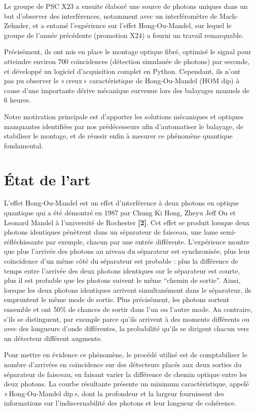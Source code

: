 \documentclass[a4paper, 12pt]{article}
\begin{document}
Le groupe de PSC X23 a ensuite élaboré une source de photons uniques dans un but d’observer des interférences, notamment avec un interféromètre de Mach-Zehnder, et a entamé l’expérience sur l’effet Hong-Ou-Mandel, sur lequel le groupe de l’année précédente (promotion X24) a fourni un travail remarquable.

Précisément, ils ont mis en place le montage optique fibré, optimisé le signal pour atteindre environ 700 coïncidences (détection simulanée de photons) par seconde, et développé un logiciel d'acquisition complet en Python. Cependant, ils n'ont pas pu observer le « creux » caractéristique de Hong-Ou-Mandel (HOM dip) à cause d'une importante dérive mécanique survenue lors des balayages manuels de 6 heures.

Notre motivation principale est d'apporter les solutions mécaniques et optiques manquantes identifiées par nos prédécesseurs afin d'automatiser le balayage, de stabiliser le montage, et de réussir enfin à mesurer ce phénomène quantique fondamental.

\clearpage
\section{État de l’art}

L'effet Hong-Ou-Mandel est un effet d'interférence à deux photons en optique quantique qui a été démontré en 1987 par Chung Ki Hong, Zheyu Jeff Ou et Leonard Mandel à l'université de Rochester \textbf{[2]}. Cet effet se produit lorsque deux photons identiques pénètrent dans un séparateur de faisceau, une lame semi-réfléchissante par exemple, chacun par une entrée différente. L’expérience montre que plus l’arrivée des photons au niveau du séparateur est synchronisée, plus leur coïncidence d’un même côté du séparateur est probable : plus la différence de temps entre l’arrivée des deux photons identiques sur le séparateur est courte, plus il est probable que les photons suivent le même “chemin de sortie”. Ainsi, lorsque les deux photons identiques arrivent simultanément dans le séparateur, ils empruntent le même mode de sortie. Plus précisément, les photons sortent ensemble et ont 50\% de chances de sortir dans l'un ou l'autre mode. Au contraire, s'ils se distinguent, par exemple parce qu'ils arrivent à des moments différents ou avec des longueurs d'onde différentes, la probabilité qu'ils se dirigent chacun vers un détecteur différent augmente.

Pour mettre en évidence ce phénomène, le procédé utilisé est de comptabiliser le nombre d’arrivées en coïncidence sur des détecteurs placés aux deux sorties du séparateur de faisceau, en faisant varier la différence de chemin optique entre les deux photons. La courbe résultante présente un minimum caractéristique, appelé « Hong-Ou-Mandel dip », dont la profondeur et la largeur fournissent des informations sur l'indiscernabilité des photons et leur longueur de cohérence.
\end{document}
